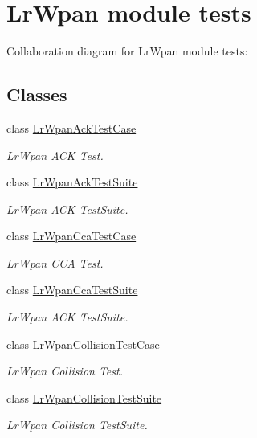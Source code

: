 \hypertarget{group__lr-wpan-test}{}\section{Lr\+Wpan module tests}
\label{group__lr-wpan-test}
Collaboration diagram for Lr\+Wpan module tests\+:
\subsection*{Classes}
\begin{DoxyCompactItemize}
\item 
class \hyperlink{classLrWpanAckTestCase}{Lr\+Wpan\+Ack\+Test\+Case}
\begin{DoxyCompactList}\small\item\em Lr\+Wpan A\+CK Test. \end{DoxyCompactList}\item 
class \hyperlink{classLrWpanAckTestSuite}{Lr\+Wpan\+Ack\+Test\+Suite}
\begin{DoxyCompactList}\small\item\em Lr\+Wpan A\+CK Test\+Suite. \end{DoxyCompactList}\item 
class \hyperlink{classLrWpanCcaTestCase}{Lr\+Wpan\+Cca\+Test\+Case}
\begin{DoxyCompactList}\small\item\em Lr\+Wpan C\+CA Test. \end{DoxyCompactList}\item 
class \hyperlink{classLrWpanCcaTestSuite}{Lr\+Wpan\+Cca\+Test\+Suite}
\begin{DoxyCompactList}\small\item\em Lr\+Wpan A\+CK Test\+Suite. \end{DoxyCompactList}\item 
class \hyperlink{classLrWpanCollisionTestCase}{Lr\+Wpan\+Collision\+Test\+Case}
\begin{DoxyCompactList}\small\item\em Lr\+Wpan Collision Test. \end{DoxyCompactList}\item 
class \hyperlink{classLrWpanCollisionTestSuite}{Lr\+Wpan\+Collision\+Test\+Suite}
\begin{DoxyCompactList}\small\item\em Lr\+Wpan Collision Test\+Suite. \end{DoxyCompactList}\item 

\end{DoxyCompactItemize}

